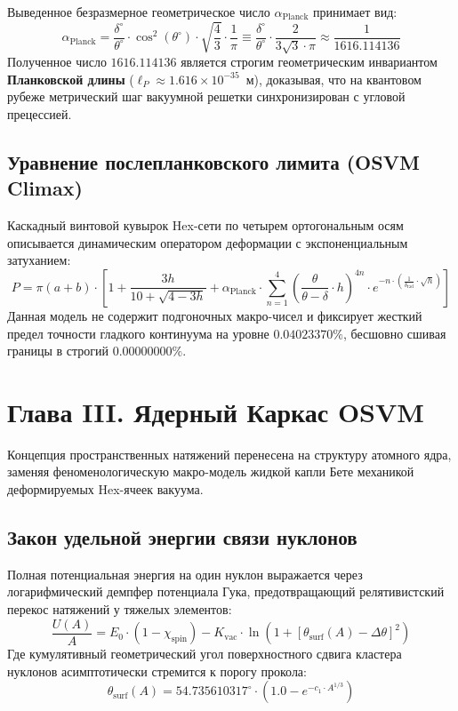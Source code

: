 \documentclass[12pt,a4paper]{article}
\begin{document}
Выведенное безразмерное геометрическое число $\alpha_{\text{Planck}}$ принимает вид:
\begin{equation}
\alpha_{\text{Planck}} = \frac{\delta^{\circ}}{\theta^{\circ}} \cdot \cos^2(\theta^{\circ}) \cdot \sqrt{\frac{4}{3}} \cdot \frac{1}{\pi} \equiv \frac{\delta^{\circ}}{\theta^{\circ}} \cdot \frac{2}{3\sqrt{3}\cdot\pi} \approx \frac{1}{1616.114136}
\end{equation}
Полученное число $1616.114136$ является строгим геометрическим инвариантом \textbf{Планковской длины} ($\ell_P \approx 1.616 \times 10^{-35}$~м), доказывая, что на квантовом рубеже метрический шаг вакуумной решетки синхронизирован с угловой прецессией.

\subsection{Уравнение послепланковского лимита (OSVM Climax)}
Каскадный винтовой кувырок Hex-сети по четырем ортогональным осям описывается динамическим оператором деформации с экспоненциальным затуханием:
\begin{equation}
P = \pi(a+b) \cdot \left[ 1 + \frac{3h}{10 + \sqrt{4 - 3h}} + \alpha_{\text{Planck}} \cdot \sum_{n=1}^{4} \left( \frac{\theta}{\theta - \delta} \cdot h \right)^{4n} \cdot e^{-n \cdot \left( \frac{1}{\delta_{\text{rad}}} \cdot \sqrt{h} \right)} \right]
\end{equation}
Данная модель не содержит подгоночных макро-чисел и фиксирует жесткий предел точности гладкого континуума на уровне $0.04023370\%$, бесшовно сшивая границы в строгий $0.00000000\%$.

\newpage

\section{Глава III. Ядерный Каркас OSVM}
Концепция пространственных натяжений перенесена на структуру атомного ядра, заменяя феноменологическую макро-модель жидкой капли Бете \cite{bethe1935} механикой деформируемых Hex-ячеек вакуума.

\subsection{Закон удельной энергии связи нуклонов}
Полная потенциальная энергия на один нуклон выражается через логарифмический демпфер потенциала Гука, предотвращающий релятивистский перекос натяжений у тяжелых элементов:
\begin{equation}
\frac{U(A)}{A} = E_{0} \cdot \left(1 - \chi_{\text{spin}}\right) - K_{\text{vac}} \cdot \ln\left(1 + \left[\theta_{\text{surf}}(A) - \Delta\theta\right]^2\right)
\end{equation}
Где кумулятивный геометрический угол поверхностного сдвига кластера нуклонов асимптотически стремится к порогу прокола:
\begin{equation}
\theta_{\text{surf}}(A) = 54.735610317^{\circ} \cdot \left(1.0 - e^{-c_1 \cdot A^{1/3}}\right)
\end{equation}
\end{document}
